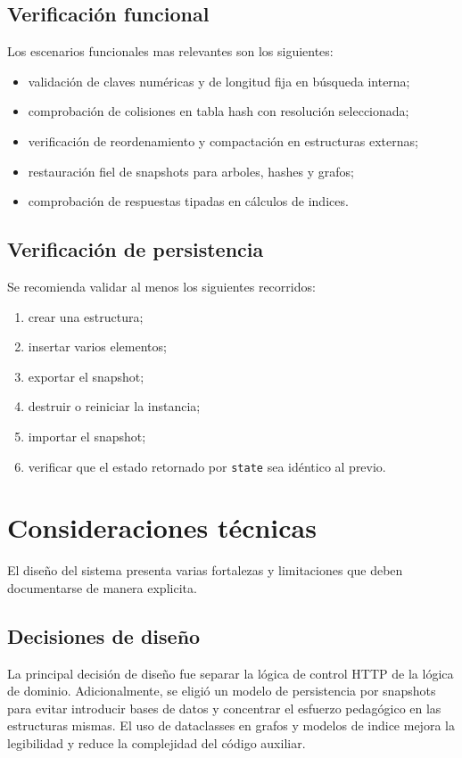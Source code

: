 \documentclass[12pt,onecolumn]{IEEEtran}
\begin{document}
\subsection{Verificación funcional}
Los escenarios funcionales mas relevantes son los siguientes:
\begin{itemize}
  \item validación de claves numéricas y de longitud fija en búsqueda interna;
  \item comprobación de colisiones en tabla hash con resolución seleccionada;
  \item verificación de reordenamiento y compactación en estructuras externas;
  \item restauración fiel de snapshots para arboles, hashes y grafos;
  \item comprobación de respuestas tipadas en cálculos de indices.
\end{itemize}

\subsection{Verificación de persistencia}
Se recomienda validar al menos los siguientes recorridos:
\begin{enumerate}
  \item crear una estructura;
  \item insertar varios elementos;
  \item exportar el snapshot;
  \item destruir o reiniciar la instancia;
  \item importar el snapshot;
  \item verificar que el estado retornado por \texttt{state} sea idéntico al previo.
\end{enumerate}

\section{Consideraciones técnicas}
El diseño del sistema presenta varias fortalezas y limitaciones que deben documentarse de manera explicita.

\subsection{Decisiones de diseño}
La principal decisión de diseño fue separar la lógica de control HTTP de la lógica de dominio. Adicionalmente, se eligió un modelo de persistencia por snapshots para evitar introducir bases de datos y concentrar el esfuerzo pedagógico en las estructuras mismas. El uso de dataclasses en grafos y modelos de indice mejora la legibilidad y reduce la complejidad del código auxiliar.
\end{document}
